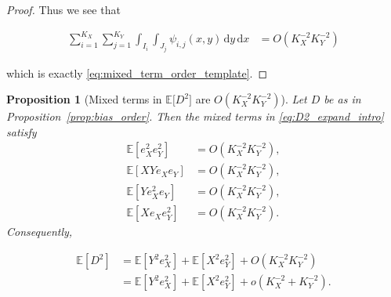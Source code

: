 \documentclass{article}
\newtheorem{proposition}{Proposition}
\newcommand{\E}{\mathbb{E}}
\newcommand{\dd}{\,\mathrm{d}}
\begin{document}
\begin{proof}
Thus we see that

\begin{align*}
    \sum_{i=1}^{K_X}\sum_{j=1}^{K_Y}\int_{I_i}\int_{J_j}\psi_{i,j}(x,y)
\dd y\dd x &= O(K_X^{-2} K_Y^{-2})
\end{align*}

which is exactly \eqref{eq:mixed_term_order_template}.
\end{proof}

\begin{proposition}[Mixed terms in $\E\lbrack D^2\rbrack$ are ${O(K_X^{-2}K_Y^{-2})}$]\label{prop:mixed_terms}
Let $D$ be as in Proposition~\ref{prop:bias_order}. Then the mixed terms in \eqref{eq:D2_expand_intro} satisfy
\begin{align}
\E[e_X^2e_Y^2] &= O(K_X^{-2}K_Y^{-2}),\label{eq:ex2ey2_order}\\
\E[XYe_Xe_Y] &= O(K_X^{-2}K_Y^{-2}),\label{eq:xyexey_order}\\
\E[Ye_X^2e_Y] &= O(K_X^{-2}K_Y^{-2}),\label{eq:yex2ey_order}\\
\E[Xe_Xe_Y^2] &= O(K_X^{-2}K_Y^{-2}).\label{eq:xexey2_order}
\end{align}
Consequently,

\begin{align*}
    \E[D^2]&=\E[Y^2e_X^2]+\E[X^2e_Y^2]+O(K_X^{-2}K_Y^{-2})\\
&=\E[Y^2e_X^2]+\E[X^2e_Y^2]+o(K_X^{-2}+K_Y^{-2}).
\end{align*}
\end{proposition}
\end{document}
